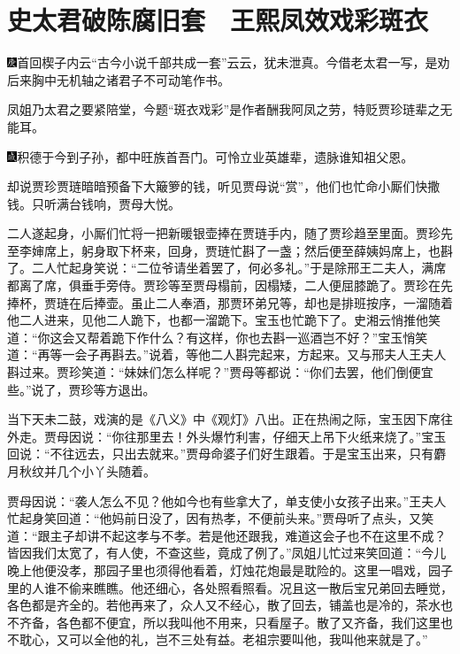 

\chapter{史太君破陈腐旧套　王熙凤效戏彩斑衣}

{\includegraphics[width=3mm]{../Images/00004}首回楔子内云``古今小说千部共成一套''云云，犹未泄真。今借老太君一写，是劝后来胸中无机轴之诸君子不可动笔作书。}

{凤姐乃太君之要紧陪堂，今题``斑衣戏彩''是作者酬我阿凤之劳，特贬贾珍琏辈之无能耳。}

{\includegraphics[width=3mm]{../Images/00005}积德于今到子孙，都中旺族首吾门。可怜立业英雄辈，遗脉谁知祖父恩。}

却说贾珍贾琏暗暗预备下大簸箩的钱，听见贾母说``赏''，他们也忙命小厮们快撒钱。只听满台钱响，贾母大悦。

二人遂起身，小厮们忙将一把新暖银壶捧在贾琏手内，随了贾珍趋至里面。贾珍先至李婶席上，躬身取下杯来，回身，贾琏忙斟了一盏；然后便至薛姨妈席上，也斟了。二人忙起身笑说：``二位爷请坐着罢了，何必多礼。''于是除邢王二夫人，满席都离了席，俱垂手旁侍。贾珍等至贾母榻前，因榻矮，二人便屈膝跪了。贾珍在先捧杯，贾琏在后捧壶。虽止二人奉酒，那贾环弟兄等，却也是排班按序，一溜随着他二人进来，见他二人跪下，也都一溜跪下。宝玉也忙跪下了。史湘云悄推他笑道：``你这会又帮着跪下作什么？有这样，你也去斟一巡酒岂不好？''宝玉悄笑道：``再等一会子再斟去。''说着，等他二人斟完起来，方起来。又与邢夫人王夫人斟过来。贾珍笑道：``妹妹们怎么样呢？''贾母等都说：``你们去罢，他们倒便宜些。''说了，贾珍等方退出。

当下天未二鼓，戏演的是《八义》中《观灯》八出。正在热闹之际，宝玉因下席往外走。贾母因说：``你往那里去！外头爆竹利害，仔细天上吊下火纸来烧了。''宝玉回说：``不往远去，只出去就来。''贾母命婆子们好生跟着。于是宝玉出来，只有麝月秋纹并几个小丫头随着。

贾母因说：``袭人怎么不见？他如今也有些拿大了，单支使小女孩子出来。''王夫人忙起身笑回道：``他妈前日没了，因有热孝，不便前头来。''贾母听了点头，又笑道：``跟主子却讲不起这孝与不孝。若是他还跟我，难道这会子也不在这里不成？皆因我们太宽了，有人使，不查这些，竟成了例了。''凤姐儿忙过来笑回道：``今儿晚上他便没孝，那园子里也须得他看着，灯烛花炮最是耽险的。这里一唱戏，园子里的人谁不偷来瞧瞧。他还细心，各处照看照看。况且这一散后宝兄弟回去睡觉，各色都是齐全的。若他再来了，众人又不经心，散了回去，铺盖也是冷的，茶水也不齐备，各色都不便宜，所以我叫他不用来，只看屋子。散了又齐备，我们这里也不耽心，又可以全他的礼，岂不三处有益。老祖宗要叫他，我叫他来就是了。''

